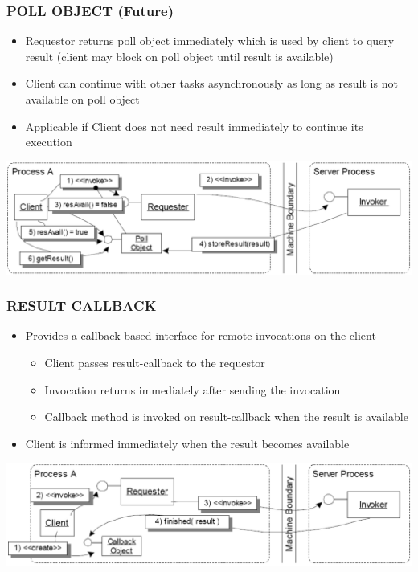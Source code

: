 \documentclass[10pt]{article}
\begin{document}
\subsubsection{POLL OBJECT (Future)}
\begin{itemize}
	\item Requestor returns poll object immediately which is used by client to query result (client may block on poll object until result is available)
	\item Client can continue with other tasks asynchronously as long as result is not available on poll object
	\item Applicable if Client does not need result immediately to continue its execution
\end{itemize}
\begin{center}
	\includegraphics[scale=0.2]{images/poll-object.png}
\end{center}
\subsubsection{RESULT CALLBACK}
\begin{itemize}
	\item Provides a callback-based interface for remote invocations on the client
		\begin{itemize}
			\item Client passes result-callback to the requestor
			\item Invocation returns immediately after sending the invocation
			\item Callback method is invoked on result-callback when the result is available
		\end{itemize}
	\item Client is informed immediately when the result becomes available
\end{itemize}
\begin{center}
	\includegraphics[scale=0.2]{images/result-callback.png}
\end{center}
\end{document}
